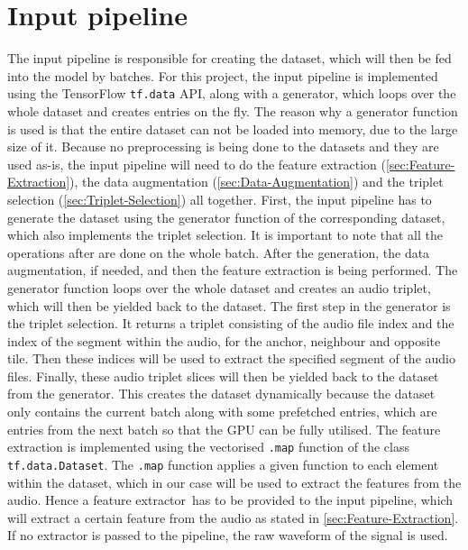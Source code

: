 \section{Input pipeline}
\label{sec:Input-Pipeline}
The input pipeline is responsible for creating the dataset, which will then be fed into the model by batches. For this project, the input pipeline is implemented using the TensorFlow \texttt{tf.data} API\footnotemark, along with a generator, which loops over the whole dataset and creates entries on the fly. The reason why a generator function is used is that the entire dataset can not be loaded into memory, due to the large size of it.
\newline
\newline
Because no preprocessing is being done to the datasets and they are used as-is, the input pipeline will need to do the feature extraction (\ref{sec:Feature-Extraction}), the data augmentation (\ref{sec:Data-Augmentation}) and the triplet selection (\ref{sec:Triplet-Selection}) all together.
\newline
\newline
First, the input pipeline has to generate the dataset using the generator function of the corresponding dataset, which also implements the triplet selection. It is important to note that all the operations after are done on the whole batch. After the generation, the data augmentation, if needed, and then the feature extraction is being performed.
\newline
\newline
The generator function loops over the whole dataset and creates an audio triplet, which will then be yielded back to the dataset. The first step in the generator is the triplet selection. It returns a triplet consisting of the audio file index and the index of the segment within the audio, for the anchor, neighbour and opposite tile. Then these indices will be used to extract the specified segment of the audio files. Finally, these audio triplet slices will then be yielded back to the dataset from the generator.
\newline
\newline
This creates the dataset dynamically because the dataset only contains the current batch along with some prefetched entries, which are entries from the next batch so that the \gls{GPU} can be fully utilised.
\newline
\newline
The feature extraction is implemented using the vectorised \texttt{.map} function of the class \texttt{tf.data.Dataset}\footnotemark. The \texttt{.map} function applies a given function to each element within the dataset, which in our case will be used to extract the features from the audio. Hence a \flqq feature extractor\frqq \ has to be provided to the input pipeline, which will extract a certain feature from the audio as stated in \ref{sec:Feature-Extraction}. If no extractor is passed to the pipeline, the raw waveform of the signal is used.
